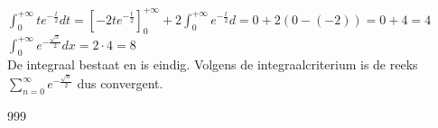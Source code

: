 \documentclass[a4paper]{article}
\begin{document}
$\displaystyle\int_0^{+\infty} te^{-\tfrac{t}{2}}dt
  = \left[-2te^{-\tfrac{t}{2}}\right]_0^{+\infty}
    + 2\displaystyle\int_0^{+\infty} e^{-\tfrac{t}{2}}d = 0 + 2\left(0-(-2)\right) = 0 + 4 = 4$\\
    
$\displaystyle\int_0^{+\infty} e^{-\tfrac{\sqrt{x}}{2}}dx = 2 \cdot 4 = 8$\\

De integraal bestaat en is eindig. Volgens de integraalcriterium is de reeks
$\displaystyle\sum_{n=0}^{\infty} e^{-\tfrac{\sqrt{n}}{2}}$ dus convergent.

\begin{thebibliography}{999}
\end{thebibliography}
\end{document}
